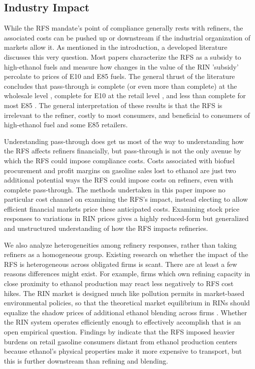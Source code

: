 \documentclass[11pt]{article}
\begin{document}
\subsection{Industry Impact}

While the RFS mandate's point of compliance generally rests with refiners, the associated costs can be pushed up or downstream if the industrial organization of markets allow it. As mentioned in the introduction, a developed literature discusses this very question. Most papers characterize the RFS as a subsidy to high-ethanol fuels and measure how changes in the value of the RIN 'subsidy' percolate to prices of E10 and E85 fuels. The general thrust of the literature concludes that pass-through is complete (or even more than complete) at the wholesale level \citep{Burkhardt2016,Knittel2017,Lade2019}, complete for E10 at the retail level \citep{Pouliot2017,Lade2019,Li2019}, and less than complete for most E85 \citep{Lade2019,Li2019}. The general interpretation of these results is that the RFS is irrelevant to the refiner, costly to most consumers, and beneficial to consumers of high-ethanol fuel and some E85 retailers.

Understanding pass-through does get us most of the way to understanding how the RFS affects refiners financially, but pass-through is not the only avenue by which the RFS could impose compliance costs. Costs associated with biofuel procurement and profit margins on gasoline sales lost to ethanol are just two additional potential ways the RFS could impose costs on refiners, even with complete pass-through. The methods undertaken in this paper impose no particular cost channel on examining the RFS's impact, instead electing to allow efficient financial markets price these anticipated costs. Examining stock price responses to variations in RIN prices gives a highly reduced-form but generalized and unstructured understanding of how the RFS impacts refineries. 

We also analyze heterogeneities among refinery responses, rather than taking refiners as a homogeneous group. Existing research on whether the impact of the RFS is heterogeneous across obligated firms is scant. There are at least a few reasons differences might exist. For example, firms which own refining capacity in close proximity to ethanol production may react less negatively to RFS cost hikes. The RIN market is designed much like pollution permits in market-based environmental policies, so that the theoretical market equilibrium in RINs should equalize the shadow prices of additional ethanol blending across firms \citep{Montgomery1972}. Whether the RIN system operates efficiently enough to effectively accomplish that is an open empirical question. Findings by \cite{LaRiviere2017} indicate that the RFS imposed heavier burdens on retail gasoline consumers distant from ethanol production centers because ethanol's physical properties make it more expensive to transport, but this is further downstream than refining and blending.
\end{document}
